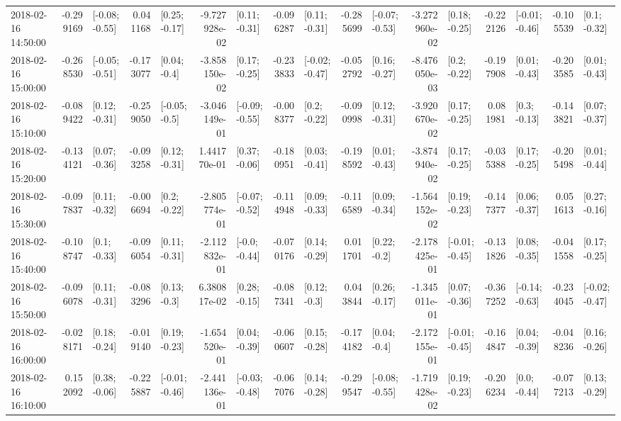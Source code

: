 \begin{tabular}{lrlrlrlrlrlrlrlrl}
2018-02-16 14:50:00 & -0.299169 &  [-0.08; -0.55] &  0.041168 &   [0.25; -0.17] & -9.727928e-02 &   [0.11; -0.31] & -0.096287 &   [0.11; -0.31] & -0.285699 &  [-0.07; -0.53] & -3.272960e-02 &   [0.18; -0.25] & -0.222126 &  [-0.01; -0.46] & -0.105539 &    [0.1; -0.32] \\
2018-02-16 15:00:00 & -0.268530 &  [-0.05; -0.51] & -0.173077 &    [0.04; -0.4] & -3.858150e-02 &   [0.17; -0.25] & -0.233833 &  [-0.02; -0.47] & -0.052792 &   [0.16; -0.27] & -8.476050e-03 &    [0.2; -0.22] & -0.197908 &   [0.01; -0.43] & -0.203585 &   [0.01; -0.43] \\
2018-02-16 15:10:00 & -0.089422 &   [0.12; -0.31] & -0.259050 &   [-0.05; -0.5] & -3.046149e-01 &  [-0.09; -0.55] & -0.008377 &    [0.2; -0.22] & -0.090998 &   [0.12; -0.31] & -3.920670e-02 &   [0.17; -0.25] &  0.081981 &    [0.3; -0.13] & -0.143821 &   [0.07; -0.37] \\
2018-02-16 15:20:00 & -0.134121 &   [0.07; -0.36] & -0.093258 &   [0.12; -0.31] &  1.441770e-01 &   [0.37; -0.06] & -0.180951 &   [0.03; -0.41] & -0.198592 &   [0.01; -0.43] & -3.874940e-02 &   [0.17; -0.25] & -0.035388 &   [0.17; -0.25] & -0.205498 &   [0.01; -0.44] \\
2018-02-16 15:30:00 & -0.097837 &   [0.11; -0.32] & -0.006694 &    [0.2; -0.22] & -2.805774e-01 &  [-0.07; -0.52] & -0.114948 &   [0.09; -0.33] & -0.116589 &   [0.09; -0.34] & -1.564152e-02 &   [0.19; -0.23] & -0.147377 &   [0.06; -0.37] &  0.051613 &   [0.27; -0.16] \\
2018-02-16 15:40:00 & -0.108747 &    [0.1; -0.33] & -0.096054 &   [0.11; -0.31] & -2.112832e-01 &   [-0.0; -0.44] & -0.070176 &   [0.14; -0.29] &  0.011701 &    [0.22; -0.2] & -2.178425e-01 &  [-0.01; -0.45] & -0.131826 &   [0.08; -0.35] & -0.041558 &   [0.17; -0.25] \\
2018-02-16 15:50:00 & -0.096078 &   [0.11; -0.31] & -0.083296 &    [0.13; -0.3] &  6.380817e-02 &   [0.28; -0.15] & -0.087341 &    [0.12; -0.3] &  0.043844 &   [0.26; -0.17] & -1.345011e-01 &   [0.07; -0.36] & -0.367252 &  [-0.14; -0.63] & -0.234045 &  [-0.02; -0.47] \\
2018-02-16 16:00:00 & -0.028171 &   [0.18; -0.24] & -0.019140 &   [0.19; -0.23] & -1.654520e-01 &   [0.04; -0.39] & -0.060607 &   [0.15; -0.28] & -0.174182 &    [0.04; -0.4] & -2.172155e-01 &  [-0.01; -0.45] & -0.164847 &   [0.04; -0.39] & -0.048236 &   [0.16; -0.26] \\
2018-02-16 16:10:00 &  0.152092 &   [0.38; -0.06] & -0.225887 &  [-0.01; -0.46] & -2.441136e-01 &  [-0.03; -0.48] & -0.067076 &   [0.14; -0.28] & -0.299547 &  [-0.08; -0.55] & -1.719428e-02 &   [0.19; -0.23] & -0.206234 &    [0.0; -0.44] & -0.077213 &   [0.13; -0.29] \\

\end{tabular}
